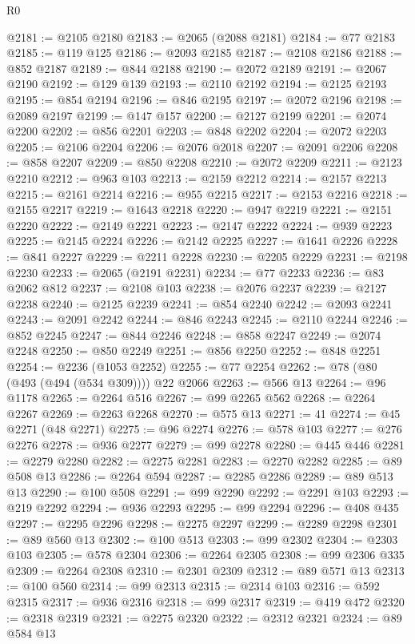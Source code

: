 \begin{lexlean}{R0}
\begin{coremodule}
@2181 := @2105 @2180
@2183 := @2065 (@2088 @2181)
@2184 := @77 @2183
@2185 := @119 @125
@2186 := @2093 @2185
@2187 := @2108 @2186
@2188 := @852 @2187
@2189 := @844 @2188
@2190 := @2072 @2189
@2191 := @2067 @2190
@2192 := @129 @139
@2193 := @2110 @2192
@2194 := @2125 @2193
@2195 := @854 @2194
@2196 := @846 @2195
@2197 := @2072 @2196
@2198 := @2089 @2197
@2199 := @147 @157
@2200 := @2127 @2199
@2201 := @2074 @2200
@2202 := @856 @2201
@2203 := @848 @2202
@2204 := @2072 @2203
@2205 := @2106 @2204
@2206 := @2076 @2018
@2207 := @2091 @2206
@2208 := @858 @2207
@2209 := @850 @2208
@2210 := @2072 @2209
@2211 := @2123 @2210
@2212 := @963 @103
@2213 := @2159 @2212
@2214 := @2157 @2213
@2215 := @2161 @2214
@2216 := @955 @2215
@2217 := @2153 @2216
@2218 := @2155 @2217
@2219 := @1643 @2218
@2220 := @947 @2219
@2221 := @2151 @2220
@2222 := @2149 @2221
@2223 := @2147 @2222
@2224 := @939 @2223
@2225 := @2145 @2224
@2226 := @2142 @2225
@2227 := @1641 @2226
@2228 := @841 @2227
@2229 := @2211 @2228
@2230 := @2205 @2229
@2231 := @2198 @2230
@2233 := @2065 (@2191 @2231)
@2234 := @77 @2233
@2236 := @83 @2062 @812
@2237 := @2108 @103
@2238 := @2076 @2237
@2239 := @2127 @2238
@2240 := @2125 @2239
@2241 := @854 @2240
@2242 := @2093 @2241
@2243 := @2091 @2242
@2244 := @846 @2243
@2245 := @2110 @2244
@2246 := @852 @2245
@2247 := @844 @2246
@2248 := @858 @2247
@2249 := @2074 @2248
@2250 := @850 @2249
@2251 := @856 @2250
@2252 := @848 @2251
@2254 := @2236 (@1053 @2252)
@2255 := @77 @2254
@2262 := @78 (@80 (@493 (@494 (@534 @309)))) @22 @2066
@2263 := @566 @13
@2264 := @96 @1178
@2265 := @2264 @516
@2267 := @99 @2265 @562
@2268 := @2264 @2267
@2269 := @2263 @2268
@2270 := @575 @13
@2271 := 41
@2274 := @45 @2271 (@48 @2271)
@2275 := @96 @2274
@2276 := @578 @103
@2277 := @276 @2276
@2278 := @936 @2277
@2279 := @99 @2278
@2280 := @445 @446
@2281 := @2279 @2280
@2282 := @2275 @2281
@2283 := @2270 @2282
@2285 := @89 @508 @13
@2286 := @2264 @594
@2287 := @2285 @2286
@2289 := @89 @513 @13
@2290 := @100 @508
@2291 := @99 @2290
@2292 := @2291 @103
@2293 := @219 @2292
@2294 := @936 @2293
@2295 := @99 @2294
@2296 := @408 @435
@2297 := @2295 @2296
@2298 := @2275 @2297
@2299 := @2289 @2298
@2301 := @89 @560 @13
@2302 := @100 @513
@2303 := @99 @2302
@2304 := @2303 @103
@2305 := @578 @2304
@2306 := @2264 @2305
@2308 := @99 @2306 @335
@2309 := @2264 @2308
@2310 := @2301 @2309
@2312 := @89 @571 @13
@2313 := @100 @560
@2314 := @99 @2313
@2315 := @2314 @103
@2316 := @592 @2315
@2317 := @936 @2316
@2318 := @99 @2317
@2319 := @419 @472
@2320 := @2318 @2319
@2321 := @2275 @2320
@2322 := @2312 @2321
@2324 := @89 @584 @13

\end{coremodule}
\end{lexlean}
